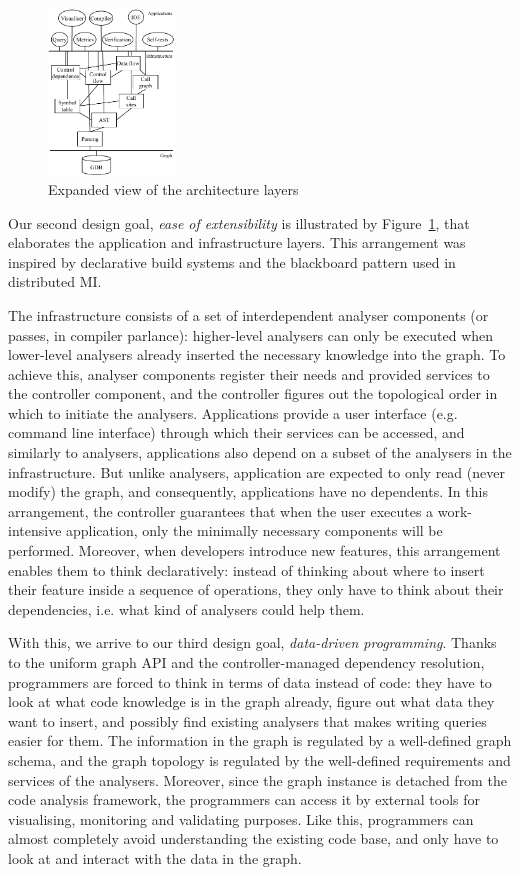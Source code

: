 \documentclass[sigconf]{acmart}
\begin{document}
  \begin{figure}
    \includegraphics[width=0.3\textwidth]{figures/arch-deps.pdf}
    \caption{Expanded view of the architecture layers}\label{fig:arch-deps}
  \end{figure}

Our second design goal, \textit{ease of extensibility} is illustrated by Figure~\ref{fig:arch-deps}, that elaborates the application and infrastructure layers. 
This arrangement was inspired by declarative build systems and the blackboard pattern used in distributed MI.

The infrastructure consists of a set of interdependent analyser components (or passes, in compiler parlance): higher-level analysers can only be executed when lower-level analysers already inserted the necessary knowledge into the graph. To achieve this, analyser components register their needs and provided services to the controller component, and the controller figures out the topological order in which to initiate the analysers. 
Applications provide a user interface (e.g. command line interface) through which their services can be accessed, and similarly to analysers, applications also depend on a subset of the analysers in the infrastructure. But unlike analysers, application are expected to only read (never modify) the graph, and consequently, applications have no dependents. 
In this arrangement, the controller guarantees that when the user executes a work-intensive application, only the minimally necessary components will be performed.
Moreover, when developers introduce new features, this arrangement enables them to think declaratively: instead of thinking about where to insert their feature inside a sequence of operations, they only have to think about their dependencies, i.e. what kind of analysers could help them.

With this, we arrive to our third design goal, \textit{data-driven programming}. Thanks to the uniform graph API and the controller-managed dependency resolution, programmers are forced to think in terms of data instead of code: they have to look at what code knowledge is in the graph already, figure out what data they want to insert, and possibly find existing analysers that makes writing queries  easier for them. 
The information in the graph is regulated by a well-defined graph schema, and the graph topology is regulated by the well-defined requirements and services of the analysers. Moreover, since the graph instance is detached from the code analysis framework, the programmers can access it by external tools for visualising, monitoring and validating purposes.
Like this, programmers can almost completely avoid understanding the existing code base, and only have to look at and interact with the data in the graph.  
\end{document}
